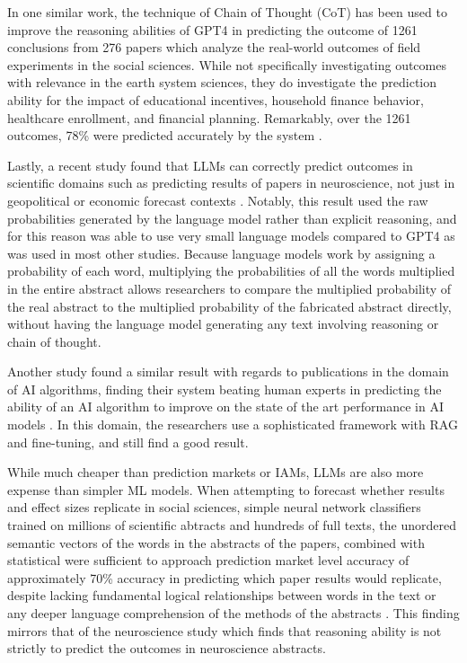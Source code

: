 \documentclass[12pt,a4paper]{article}
\begin{document}
In one similar work, the technique of Chain of Thought (CoT) has been used to improve the reasoning abilities of GPT4 in predicting the outcome of 1261 conclusions from 276 papers which analyze the real-world outcomes of field experiments in the social sciences. While not specifically investigating outcomes with relevance in the earth system sciences, they do investigate the prediction ability for the impact of educational incentives, household finance behavior, healthcare enrollment, and financial planning. Remarkably, over the 1261 outcomes, 78\% were predicted accurately by the system .


Lastly, a recent study found that LLMs can correctly predict outcomes in scientific domains such as predicting results of papers in neuroscience, not just in geopolitical or economic forecast contexts . Notably, this result used the raw probabilities generated by the language model rather than explicit reasoning, and for this reason was able to use very small language models compared to GPT4 as was used in most other studies. Because language models work by assigning a probability of each word,  multiplying the probabilities of all the words multiplied in the entire abstract allows researchers to compare the multiplied probability of the real abstract to the multiplied probability of the fabricated abstract directly, without having the language model generating any text involving reasoning or chain of thought. 

Another study found a similar result with regards to publications in the domain of AI algorithms, finding their system beating human experts in predicting the ability of an AI algorithm to improve on the state of the art performance in AI models . In this domain, the researchers use a sophisticated framework with RAG and fine-tuning, and still find a good result.

While much cheaper than prediction markets or IAMs, LLMs are also more expense than simpler ML models. When attempting to forecast whether results and effect sizes replicate in social sciences, simple neural network classifiers trained on millions of scientific abtracts and hundreds of full texts, the unordered semantic vectors of the words in the abstracts of the papers, combined with statistical  were sufficient to approach prediction market level accuracy of approximately 70\% accuracy in predicting which paper results would replicate, despite lacking fundamental logical relationships between words in the text or any deeper language comprehension of the methods of the abstracts . This finding mirrors that of the neuroscience study  which finds that reasoning  ability is not strictly to predict the outcomes in neuroscience abstracts. 
\end{document}
